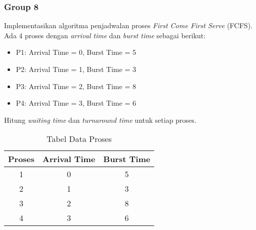 \documentclass[12pt]{article}
\begin{document}
\subsubsection{}
\subsubsection{}
\subsubsection{}
\subsubsection{}
\subsubsection{}
\subsubsection{}
\subsubsection{Group 8}
Implementasikan algoritma penjadwalan proses \textit{First Come First Serve} (FCFS). Ada 4 proses dengan \textit{arrival time} dan \textit{burst time} sebagai berikut:
\begin{itemize}
    \item P1: Arrival Time = 0, Burst Time = 5
    \item P2: Arrival Time = 1, Burst Time = 3
    \item P3: Arrival Time = 2, Burst Time = 8
    \item P4: Arrival Time = 3, Burst Time = 6
\end{itemize}
Hitung \textit{waiting time} dan \textit{turnaround time} untuk setiap proses.
\begin{table}[htbp] %
    \centering
    \begin{tabular}{|c|c|c|} %
    \hline
    Proses  & Arrival Time  & Burst Time  \\ %
    \hline
    1  & 0 & 5 \\ %
    \hline
    2 & 1 &3 \\
    \hline
    3 & 2 & 8 \\
    \hline
    4 & 3 & 6 \\
    
    \hline
    \end{tabular}
    \caption{Tabel Data Proses} %
    \label{tab:your_label} %
\end{table}
\end{document}
